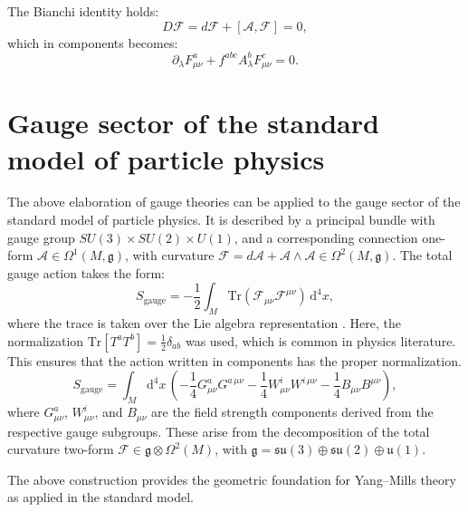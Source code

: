 The Bianchi identity holds:
\[
D\mathscr{F} = d\mathscr{F} + [\mathcal{A}, \mathscr{F}] = 0,
\]
which in components becomes:
\[
\partial_\lambda F_{\mu\nu}^a + f^{abc} A_\lambda^b F_{\mu\nu}^c = 0.
\]


\section{Gauge sector of the standard model of particle physics}

The above elaboration of gauge theories can be applied to the gauge sector of the standard model of particle physics. It is described by a principal bundle with gauge group \( SU(3) \times SU(2) \times U(1) \), and a corresponding connection one-form \( \mathcal{A} \in \Omega^1(M, \mathfrak{g}) \), with curvature \( \mathscr{F} = d\mathcal{A} + \mathcal{A} \wedge \mathcal{A} \in \Omega^2(M, \mathfrak{g}) \). The total gauge action takes the form:
\[
S_{\text{gauge}} = -\frac{1}{2} \int_M \mathrm{Tr}(\mathscr{F}_{\mu\nu} \mathscr{F}^{\mu\nu}) \, \mathrm{d}^4x,
\]
where the trace is taken over the Lie algebra representation \cite{NakaharaGeometrytopologyphysics2005}. Here, the normalization $\text{Tr}[T^aT^b]=\frac12\delta_{ab}$ was used, which is common in physics literature. This ensures that the action written in components has the proper normalization.
\[
S_{\text{gauge}} = \int_M \mathrm{d}^4x \, \left( 
  -\frac{1}{4} G_{\mu\nu}^{a} G^{a\,\mu\nu} 
  -\frac{1}{4} W_{\mu\nu}^{i} W^{i\,\mu\nu} 
  -\frac{1}{4} B_{\mu\nu} B^{\mu\nu} 
\right),
\]
where \( G_{\mu\nu}^a \), \( W_{\mu\nu}^i \), and \( B_{\mu\nu} \) are the field strength components derived from the respective gauge subgroups. These arise from the decomposition of the total curvature two-form \( \mathscr{F} \in \mathfrak{g} \otimes \Omega^2(M) \), with \( \mathfrak{g} = \mathfrak{su}(3) \oplus \mathfrak{su}(2) \oplus \mathfrak{u}(1) \).

The above construction provides the geometric foundation for Yang–Mills theory as applied in the standard model.
